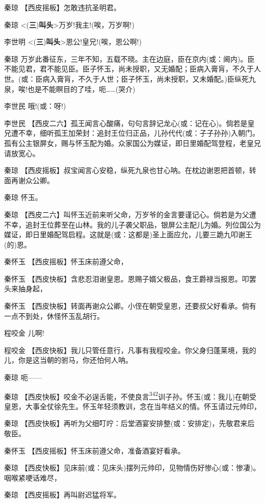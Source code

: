 秦琼 【西皮摇板】怎敢违抗圣明君。

秦琼
\textless{}(\textbf{三})\textbf{叫头}\textgreater{}万岁!我主!(唉，万岁啊!)

李世明
\textless{}(\textbf{三})\textbf{叫头}\textgreater{}恩公!皇兄!(唉，恩公啊!)

秦琼
万岁此番征东，三年不知，五载不晓。主在边庭，臣在京内(或：阃内)。臣不能见君，君不能见臣。臣子怀玉，尚未授职，又无婚配；臣病入膏肓，不久于人世。(或：臣病入膏肓，不久于人世；臣子怀玉，尚未授职，又未婚配。)臣纵死九泉，唉!也是不能瞑目的了哇，呃\ldots{}\ldots{}(哭介)

李世民 哦!(或：呀!)

李世民
【西皮二六】孤王闻言心酸痛，句句言辞记龙心(或：记在心)。倘若是皇兄遭不幸，细听孤王加荣封：追封王位归正品，儿孙代代(或：子子孙孙)入朝门。孤有公主银屏女，赐与怀玉配为婚。众家国公为媒证，即日里婚配驾登程，老皇兄请放宽心。

秦琼
【西皮摇板】叔宝闻言心安稳，纵死九泉也甘心呐。在枕边谢恩把首顿，转面再谢众公卿。

秦琼 怀玉。

秦琼
【西皮二六】叫怀玉近前来听父命，万岁爷的金言要谨记心。倘若是为父遭不幸，追封王位葬至在山林。我的儿子袭父职品，银屏公主配儿为婚。列位国公为媒证，即日里婚配驾启程。这就是(或：这都是)圣上面应允，儿要三跪九叩谢王(的)恩。

秦怀玉 【西皮摇板】怀玉床前遵父命，

秦怀玉
【西皮快板】含悲忍泪谢皇恩。恩赐子婿父极品，食王爵禄当报恩。叩罢头来抽身起，

秦怀玉
【西皮快板】转面再谢众公卿。小侄在朝受皇恩，还要叔父好看承。倘有一点不到处，休怪怀玉乱胡行。

程咬金 儿啊!

程咬金
【西皮快板】我儿只管任意行，凡事有我程咬金。你父身归蓬莱境，我的儿，你是这当朝的驸马，你还怕何人呐。

秦琼 呃------

秦琼
【西皮快板】咬金不必逞舌能，不使良言\protect\hyperlink{fn342}{\textsuperscript{342}}训子孙。怀玉(或：我儿)在朝受皇恩，大事全仗徐先生。怀玉年轻须教训，念在当年结义的情。怀玉请过元帅印，

秦琼
【西皮快板】再听为父细叮咛：后堂酒宴安排整(或：安排定)，先敬君来后敬臣。

秦怀玉 【西皮摇板】怀玉床前遵父命，准备酒宴好看承。

秦琼
【西皮快板】见床前(或：见床头)摆列元帅印，见物情伤好惨心(或：惨凄)。咽喉紧哽话难尽，

秦琼 【西皮摇板】再叫尉迟猛将军。

